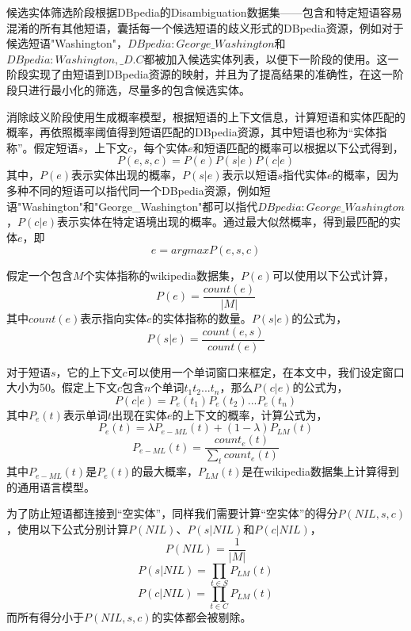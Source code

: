 候选实体筛选阶段根据DBpedia的Disambiguation数据集——包含和特定短语容易混淆的所有其他短语，囊括每一个候选短语的歧义形式的DBpedia资源，例如对于候选短语"Washington"，$DBpedia:George\_Washington$和$DBpedia:Washington,\_D.C$都被加入候选实体列表，以便下一阶段的使用。这一阶段实现了由短语到DBpedia资源的映射，并且为了提高结果的准确性，在这一阶段只进行最小化的筛选，尽量多的包含候选实体。

消除歧义阶段使用生成概率模型，根据短语的上下文信息，计算短语和实体匹配的概率，再依照概率阈值得到短语匹配的DBpedia资源，其中短语也称为“实体指称”。假定短语$s$，上下文$c$，每个实体$e$和短语匹配的概率可以根据以下公式得到，
\begin{equation}
P(e,s,c) = P(e)P(s|e)P(c|e)
\end{equation}
其中，$P(e)$表示实体出现的概率，$P(s|e)$表示以短语$s$指代实体$e$的概率，因为多种不同的短语可以指代同一个DBpedia资源，例如短语"Washington"和"George\_Washington"都可以指代$DBpedia:George\_Washington$，$P(c|e)$表示实体在特定语境出现的概率。通过最大似然概率，得到最匹配的实体$e$，即
\begin{equation}
e = argmaxP(e,s,c)
\end{equation}

假定一个包含$M$个实体指称的wikipedia数据集，$P(e)$可以使用以下公式计算，
\begin{equation}
P(e) = \frac{count(e)}{|M|}
\end{equation}
其中$count(e)$表示指向实体$e$的实体指称的数量。$P(s|e)$的公式为，
\begin{equation}
P(s|e) = \frac{count(e,s)}{count(e)}
\end{equation}

对于短语$s$，它的上下文$c$可以使用一个单词窗口来框定，在本文中，我们设定窗口大小为50。假定上下文$c$包含$n$个单词$t_1t_2...t_n$，那么$P(c|e)$的公式为，
\begin{equation}
P(c|e) = P_e(t_1)P_e(t_2)...P_e(t_n)
\end{equation}
其中$P_e(t)$表示单词$t$出现在实体$e$的上下文的概率，计算公式为，
\begin{equation}
P_e(t) = \lambda P_{e-ML}(t) + (1-\lambda)P_{LM}(t)
\end{equation}
\begin{equation}
P_{e-ML}(t) = \frac{count_e(t)}{\sum_t count_e(t)}
\end{equation}
其中$P_{e-ML}(t)$是$P_e(t)$的最大概率，$P_{LM}(t)$是在wikipedia数据集上计算得到的通用语言模型。

为了防止短语都连接到“空实体”，同样我们需要计算“空实体”的得分$P(NIL,s,c)$，使用以下公式分别计算$P(NIL)$、$P(s|NIL)$和$P(c|NIL)$，
\begin{equation}
P(NIL) = \frac{1}{|M|}
\end{equation}
\begin{equation}
P(s|NIL) = \prod_{t\in S}P_{LM}(t)
\end{equation}
\begin{equation}
P(c|NIL) = \prod_{t\in C}P_{LM}(t)
\end{equation}
而所有得分小于$P(NIL,s,c)$的实体都会被剔除。

